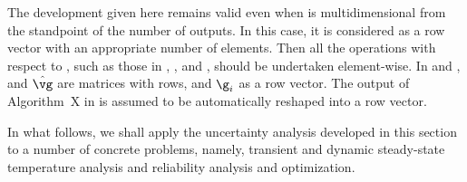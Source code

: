\begin{remark}
The development given here remains valid even when \g is multidimensional from
the standpoint of the number of outputs. In this case, it is considered as a row
vector with an appropriate number of elements. Then all the operations with
respect to \g, such as those in ,
, and , should be undertaken
element-wise. In  and , \vg and
$\hat{\vg}$ are matrices with \nc rows, and $\g_i$ as a row vector. The output
of Algorithm~X in  is assumed to be automatically reshaped
into a row vector.
\end{remark}

In what follows, we shall apply the uncertainty analysis developed in this
section to a number of concrete problems, namely, transient and dynamic
steady-state temperature analysis and reliability analysis and optimization.
